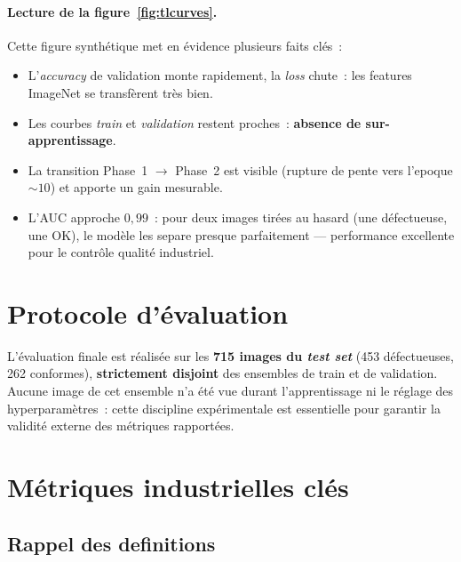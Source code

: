 \paragraph{Lecture de la figure~\ref{fig:tlcurves}.}
Cette figure synthétique met en évidence plusieurs faits clés~:
\begin{itemize}
    \item L'\emph{accuracy} de validation monte rapidement, la \emph{loss} chute~: les features ImageNet se transfèrent très bien.
    \item Les courbes \emph{train} et \emph{validation} restent proches~: \textbf{absence de sur-apprentissage}.
    \item La transition Phase~1 $\to$ Phase~2 est visible (rupture de pente vers l'epoque ${\sim}10$) et apporte un gain mesurable.
    \item L'AUC approche $0{,}99$~: pour deux images tirées au hasard (une défectueuse, une OK), le modèle les separe presque parfaitement --- performance excellente pour le contrôle qualité industriel.
\end{itemize}


\section{Protocole d'évaluation}

L'évaluation finale est réalisée sur les \textbf{715 images du \emph{test set}} (453 défectueuses, 262 conformes), \textbf{strictement disjoint} des ensembles de train et de validation. Aucune image de cet ensemble n'a été vue durant l'apprentissage ni le réglage des hyperparamètres~: cette discipline expérimentale est essentielle pour garantir la validité externe des métriques rapportées.

\section{Métriques industrielles clés}

\subsection{Rappel des definitions}

